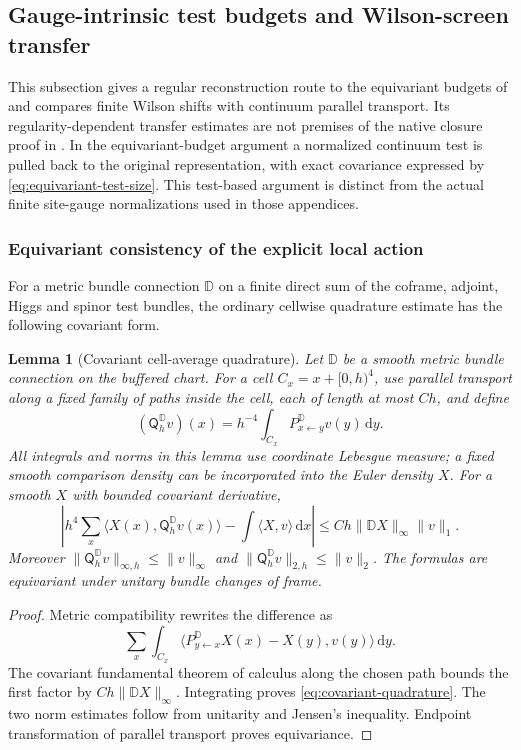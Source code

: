\documentclass[11pt]{article}
\numberwithin{equation}{section}
\newtheorem{lemma}[lemma]{Lemma}
\theoremstyle{definition}
\theoremstyle{remark}
\newcommand{\dd}{\mathrm d}
\newcommand{\norm}[1]{\lVert#1\rVert}
\newcommand{\ip}[2]{\langle#1,#2\rangle}
\begin{document}
\subsection{Gauge-intrinsic test budgets and Wilson-screen transfer}
\label{app:gauge-intrinsic-screen}

This subsection gives a regular reconstruction route to the equivariant
budgets of  and compares finite Wilson
shifts with continuum parallel transport.  Its regularity-dependent
transfer estimates are not premises of the native closure proof in
.  In the
equivariant-budget argument a normalized continuum test is pulled back to
the original representation, with exact covariance expressed by
\eqref{eq:equivariant-test-size}.  This test-based argument is distinct
from the actual finite site-gauge normalizations used in those appendices.

\subsubsection{Equivariant consistency of the explicit local action}

For a metric bundle connection $\mathbb D$ on a finite direct sum of the
coframe, adjoint, Higgs and spinor test bundles, the ordinary cellwise
quadrature estimate has the following covariant form.

\begin{lemma}[Covariant cell-average quadrature]
\label{lem:covariant-quadrature}
Let $\mathbb D$ be a smooth metric bundle connection on the buffered chart.
For a cell $C_x=x+[0,h)^4$, use parallel transport along a fixed family of
paths inside the cell, each of length at most $Ch$, and define
\begin{equation}
 (\mathsf Q_h^{\mathbb D}v)(x)
    =h^{-4}\int_{C_x}P^{\mathbb D}_{x\leftarrow y}v(y)\,\dd y.
 \label{eq:covariant-test-average}
\end{equation}
All integrals and norms in this lemma use coordinate Lebesgue measure;
a fixed smooth comparison density can be incorporated into the Euler
density $X$.
For a smooth $X$ with bounded covariant derivative,
\begin{equation}
 \left|h^4\sum_x\ip{X(x)}{\mathsf Q_h^{\mathbb D}v(x)}
       -\int\ip Xv\,\dd x\right|
 \le Ch\norm{\mathbb D X}_{\infty}\norm v_1.
 \label{eq:covariant-quadrature}
\end{equation}
Moreover
$\norm{\mathsf Q_h^{\mathbb D}v}_{\infty,h}\le\norm v_\infty$ and
$\norm{\mathsf Q_h^{\mathbb D}v}_{2,h}\le\norm v_2$.
The formulas are equivariant under unitary bundle changes of frame.
\end{lemma}
\begin{proof}
Metric compatibility rewrites the difference as
\[
 \sum_x\int_{C_x}
 \ip{P^{\mathbb D}_{y\leftarrow x}X(x)-X(y)}{v(y)}\,\dd y.
\]
The covariant fundamental theorem of calculus along the chosen path bounds
the first factor by $Ch\norm{\mathbb D X}_\infty$.
Integrating proves \eqref{eq:covariant-quadrature}.
The two norm estimates follow from unitarity and Jensen's inequality.
Endpoint transformation of parallel transport proves equivariance.
\end{proof}
\end{document}
